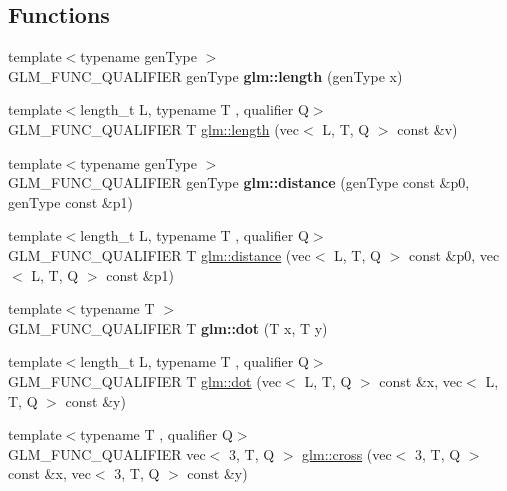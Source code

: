 \subsection*{Functions}
\begin{DoxyCompactItemize}
\item 
\mbox{\label{func__geometric_8inl_abcd8538aa95a8963803ec42c2fd654cd}} 
{\footnotesize template$<$typename gen\+Type $>$ }\\G\+L\+M\+\_\+\+F\+U\+N\+C\+\_\+\+Q\+U\+A\+L\+I\+F\+I\+ER gen\+Type {\bfseries glm\+::length} (gen\+Type x)
\item 
{\footnotesize template$<$length\+\_\+t L, typename T , qualifier Q$>$ }\\G\+L\+M\+\_\+\+F\+U\+N\+C\+\_\+\+Q\+U\+A\+L\+I\+F\+I\+ER T \hyperlink{group__core__func__geometric_ga0cdabbb000834d994a1d6dc56f8f5263}{glm\+::length} (vec$<$ L, T, Q $>$ const \&v)
\item 
\mbox{\label{func__geometric_8inl_aa7275be4cec4bfcf1c4a7add8f3ee7f4}} 
{\footnotesize template$<$typename gen\+Type $>$ }\\G\+L\+M\+\_\+\+F\+U\+N\+C\+\_\+\+Q\+U\+A\+L\+I\+F\+I\+ER gen\+Type {\bfseries glm\+::distance} (gen\+Type const \&p0, gen\+Type const \&p1)
\item 
{\footnotesize template$<$length\+\_\+t L, typename T , qualifier Q$>$ }\\G\+L\+M\+\_\+\+F\+U\+N\+C\+\_\+\+Q\+U\+A\+L\+I\+F\+I\+ER T \hyperlink{group__core__func__geometric_gaa68de6c53e20dfb2dac2d20197562e3f}{glm\+::distance} (vec$<$ L, T, Q $>$ const \&p0, vec$<$ L, T, Q $>$ const \&p1)
\item 
\mbox{\label{func__geometric_8inl_a40370edb74dec9048258c063b9c091c9}} 
{\footnotesize template$<$typename T $>$ }\\G\+L\+M\+\_\+\+F\+U\+N\+C\+\_\+\+Q\+U\+A\+L\+I\+F\+I\+ER T {\bfseries glm\+::dot} (T x, T y)
\item 
{\footnotesize template$<$length\+\_\+t L, typename T , qualifier Q$>$ }\\G\+L\+M\+\_\+\+F\+U\+N\+C\+\_\+\+Q\+U\+A\+L\+I\+F\+I\+ER T \hyperlink{group__core__func__geometric_gaad6c5d9d39bdc0bf43baf1b22e147a0a}{glm\+::dot} (vec$<$ L, T, Q $>$ const \&x, vec$<$ L, T, Q $>$ const \&y)
\item 
{\footnotesize template$<$typename T , qualifier Q$>$ }\\G\+L\+M\+\_\+\+F\+U\+N\+C\+\_\+\+Q\+U\+A\+L\+I\+F\+I\+ER vec$<$ 3, T, Q $>$ \hyperlink{group__core__func__geometric_gaeeec0794212fe84fc9d261de067c9587}{glm\+::cross} (vec$<$ 3, T, Q $>$ const \&x, vec$<$ 3, T, Q $>$ const \&y)

\end{DoxyCompactItemize}
